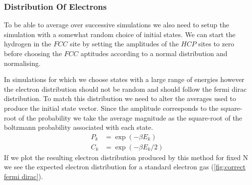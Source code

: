 \subsubsection{Distribution Of Electrons}
To be able to average over successive
simulations we also need to setup the
simulation with a somewhat random
choice of initial states.
We can start the hydrogen
in the \(FCC\) site by setting the
amplitudes of the \(HCP\) sites to zero
before choosing the \(FCC\) aptitudes according to
a normal distribution and normalising.

In simulations for which we choose states
with a large range of energies however
the electron distribution should not be
random and should follow the fermi dirac distribution.
To match this distribution we
need to alter the averages used
to produce the initial state vector.
Since the amplitude corresponds to
the square-root of the probability we
take the average magnitude as the
square-root of the boltzmann probability
associated with each state.
\begin{align}
    P_k & = \exp(-\beta{}E_k)     \\
    C_k & = \exp(-\beta{}E_k / 2)
\end{align}
If we plot the resulting
electron distribution produced
by this method for fixed N
we see the expected electron
distribution for a standard electron
gas (\cref{fig:correct fermi dirac}).
